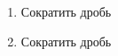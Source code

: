 \documentclass[10pt, a4paper]{article}
\begin{document}
\begin{enumerate}
\begin{multicols}{4}
\begin{enumerate}
		\end{enumerate}	
	\end{multicols}
	\item Сократить дробь
	\begin{multicols}{3}
		\begin{enumerate}
		\end{enumerate}	
	\end{multicols}
	\newpage
	\item Сократить дробь
	\begin{multicols}{3}
		\begin{enumerate}

\end{enumerate}
\end{multicols}
\end{enumerate}
\end{document}
